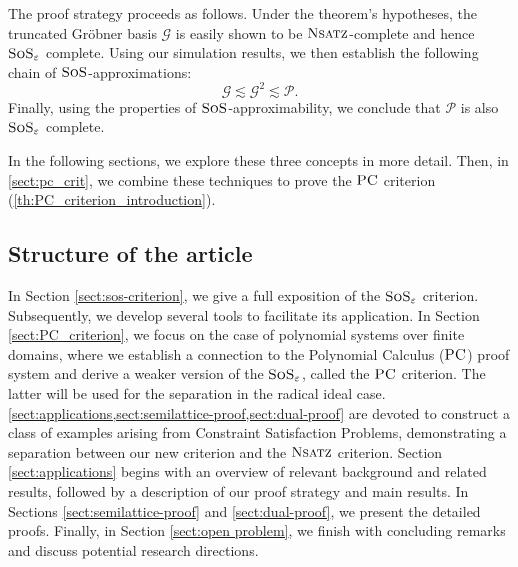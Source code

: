 \documentclass[11pt]{article}
\newcommand{\sos}{\text{\sc{SoS}}}
\newcommand{\PC}{\textsc{PC}}
\newcommand{\Nsatz}{\textsc{Nsatz}}
\newcommand{\1}{\textbf{1}}
\begin{document}
\begin{enumerate}
The proof strategy proceeds as follows. Under the theorem’s hypotheses, the truncated Gröbner basis $\mathcal{G}$ is easily shown to be $\Nsatz$-complete and hence $\sos_\varepsilon$ complete. Using our simulation results, we then establish the following chain of $\sos$-approximations:
   $$\mathcal{G}\lesssim \mathcal{G}^2 \lesssim \mathcal{P}.$$
Finally, using the properties of $\sos$-approximability, we conclude that $\mathcal{P}$ is also $\sos_\varepsilon$ complete. 
\end{enumerate}

In the following sections, we explore these three concepts in more detail. Then, in \cref{sect:pc_crit}, we combine these techniques to prove the $\PC$ criterion (\cref{th:PC_criterion_introduction}).

\subsection{Structure of the article}
In Section \ref{sect:sos-criterion}, we give a full exposition of the $\sos_\varepsilon$ criterion. Subsequently, we develop several tools to facilitate its application. In Section \ref{sect:PC_criterion}, we focus on the case of polynomial systems over finite domains, where we establish a connection to the Polynomial Calculus ($\PC$) proof system and derive a weaker version of the $\sos_\varepsilon$, called the $\PC$ criterion. The latter will be used for the separation in the radical ideal case. \cref{sect:applications,sect:semilattice-proof,sect:dual-proof} are devoted to construct a class of examples arising from Constraint Satisfaction Problems, demonstrating a separation between our new criterion and the $\Nsatz$ criterion. Section \ref{sect:applications} begins with an overview of relevant background and related results, followed by a description of our proof strategy and main results. In Sections \ref{sect:semilattice-proof} and \ref{sect:dual-proof}, we present the detailed proofs. 
Finally, in Section \ref{sect:open problem}, we finish with concluding remarks and discuss potential research directions.
\end{document}

